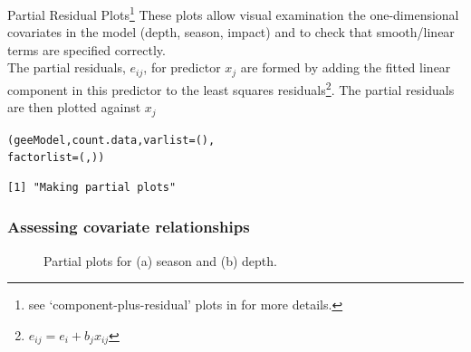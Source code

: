 \begin{frame}[fragile]
\begin{block}{Partial Residual Plots\footnote{see `component-plus-residual' plots in \citet{Fox2011} for more details.}}
These plots allow visual examination the one-dimensional covariates in the model (depth, season, impact) and to check that smooth/linear terms are specified correctly.\\

\noindent The partial residuals, $e_{ij}$,  for predictor $x_j$ are formed by adding the fitted linear component in this predictor to the least squares residuals\footnote{$e_{ij} = e_i + b_jx_{ij}$}.  The partial residuals are then plotted against $x_j$
\end{block}

\begin{knitrout}\footnotesize
{}\color{fgcolor}\begin{kframe}
\begin{alltt}
(geeModel, count.data, varlist = (), 
     factorlist =(, ))
\end{alltt}
\begin{verbatim}
[1] "Making partial plots"
\end{verbatim}
\end{kframe}
\end{knitrout}

\end{frame}

\begin{frame}[fragile]
\frametitle{Assessing covariate relationships}
\begin{figure}[h]
  \centering
  \caption{Partial plots for (a) season and (b) depth.}
  \label{fig:partials}
\end{figure}
\end{frame}

